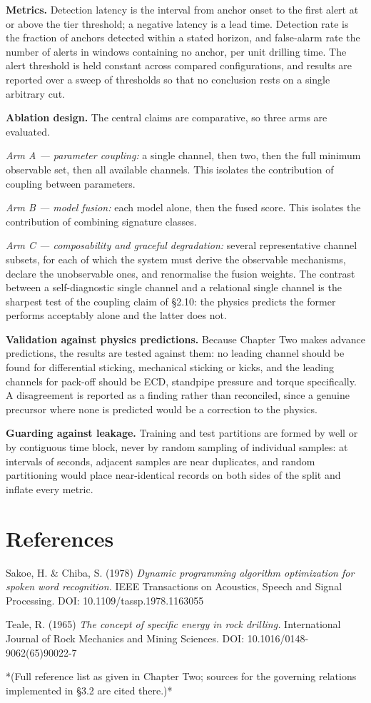 \documentclass[12pt,a4paper]{report}
\begin{document}
\textbf{Metrics.} Detection latency is the interval from anchor onset to the first alert at or above the tier
threshold; a negative latency is a lead time. Detection rate is the fraction of anchors detected within a
stated horizon, and false-alarm rate the number of alerts in windows containing no anchor, per unit
drilling time. The alert threshold is held constant across compared configurations, and results are
reported over a sweep of thresholds so that no conclusion rests on a single arbitrary cut.

\textbf{Ablation design.} The central claims are comparative, so three arms are evaluated.

\emph{Arm A --- parameter coupling:} a single channel, then two, then the full minimum observable set, then all
available channels. This isolates the contribution of coupling between parameters.

\emph{Arm B --- model fusion:} each model alone, then the fused score. This isolates the contribution of
combining signature classes.

\emph{Arm C --- composability and graceful degradation:} several representative channel subsets, for each of which
the system must derive the observable mechanisms, declare the unobservable ones, and renormalise the fusion
weights. The contrast between a self-diagnostic single channel and a relational single channel is the
sharpest test of the coupling claim of §2.10: the physics predicts the former performs acceptably alone and
the latter does not.

\textbf{Validation against physics predictions.} Because Chapter Two makes advance predictions, the results are
tested against them: no leading channel should be found for differential sticking, mechanical sticking or
kicks, and the leading channels for pack-off should be ECD, standpipe pressure and torque specifically. A
disagreement is reported as a finding rather than reconciled, since a genuine precursor where none is
predicted would be a correction to the physics.

\textbf{Guarding against leakage.} Training and test partitions are formed by well or by contiguous time block,
never by random sampling of individual samples: at intervals of seconds, adjacent samples are near
duplicates, and random partitioning would place near-identical records on both sides of the split and
inflate every metric.

\section*{References}

Sakoe, H. \& Chiba, S. (1978) \emph{Dynamic programming algorithm optimization for spoken word recognition.}
IEEE Transactions on Acoustics, Speech and Signal Processing. DOI: 10.1109/tassp.1978.1163055

Teale, R. (1965) \emph{The concept of specific energy in rock drilling.} International Journal of Rock
Mechanics and Mining Sciences. DOI: 10.1016/0148-9062(65)90022-7

*(Full reference list as given in Chapter Two; sources for the governing relations implemented in §3.2 are
cited there.)*
\end{document}
